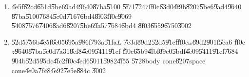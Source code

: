 \begin{enumerate}
\item \U{4e5f}\U{62cd}\U{651d}\U{5be6}\U{9ad4}\U{9640}\U{87ba}\U{5100}%
\U{5f71}\U{7247}\U{ff0c}\U{63d0}\U{4f9b}\U{8207}\U{5be6}\U{9ad4}\U{9640}%
\U{87ba}\U{5100}\U{7684}\U{5c0d}\U{7167}\U{6bd4}\U{8f03}\U{ff0c}\U{9069}%
\U{5408}\U{7576}\U{7406}\U{8ad6}\U{8207}\U{5be6}\U{9a57}\U{7684}\U{6bd4}%
\U{8f03}\U{6559}\U{6750}\U{3002}

\item \U{52d5}\U{756b}\U{4e5f}\U{6e05}\U{695a}\U{986f}\U{793a}\U{51fa}$L$%
\U{7e3d}\U{89d2}\U{52d5}\U{91cf}\U{ff0c}$\omega $\U{89d2}\U{901f}\U{5ea6}%
\U{ff0c}$z$\U{9640}\U{87ba}\U{5c0d}\U{7a31}\U{8ef8}\U{4e09}\U{5411}\U{91cf}%
\U{ff0c}\U{65b9}\U{4fbf}\U{89c0}\U{5bdf}\U{4e09}\U{5411}\U{91cf}\U{7684}%
\U{904b}\U{52d5}\U{95dc}\U{4fc2}\U{ff0c}\U{4ed6}\U{5011}\U{5982}\U{4f55}%
\U{5728}body cone\U{8207}space cone\U{4e0a}\U{76f8}\U{4e92}\U{7e5e}\U{884c}%
\U{3002}


\end{enumerate}
